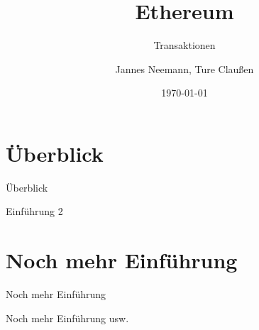 \documentclass{f4_beamer}
\title{Ethereum}
\subtitle{Transaktionen}
\author{Jannes Neemann, Ture Claußen}
\date{\today}
\begin{document}
\section{Überblick}

\begin{frame}{Überblick}

\end{frame}

\begin{frame}{Einführung 2}

\end{frame}

\section{Noch mehr Einführung}

\begin{frame}{Noch mehr Einführung}

\end{frame}

\begin{frame}{Noch mehr Einführung  usw.}

\end{frame}
\end{document}
